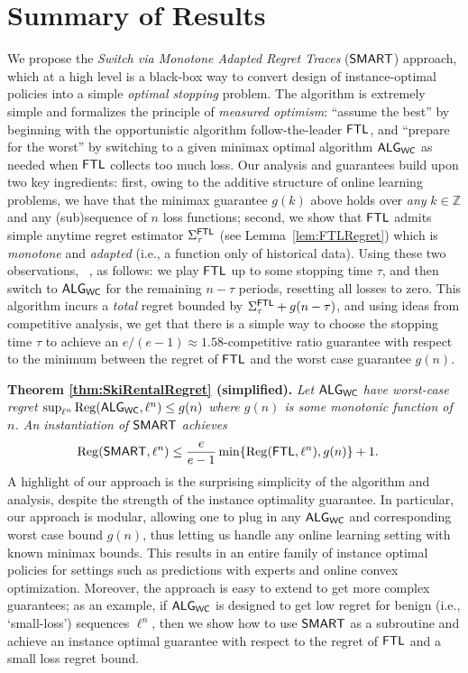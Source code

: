 \section{Summary of Results} \label{ssec:mainresults}
We propose the \emph{Switch via Monotone Adapted Regret Traces} ($\mathsf{SMART}$) approach, which at a high level is a black-box way to convert design of instance-optimal policies into a simple \emph{optimal stopping} problem. 
The algorithm is extremely simple and formalizes the principle of {\em measured optimism}: ``assume the best'' by beginning with the opportunistic algorithm follow-the-leader $\mathsf{FTL}$, and ``prepare for the worst'' by switching to a given minimax optimal algorithm $\mathsf{ALG}_{\mathsf{WC}}$ as needed when $\mathsf{FTL}$ collects too much loss.
Our analysis and guarantees build upon two key ingredients: first, owing to the additive structure of online learning problems, we have that the minimax guarantee $g(k)$ above holds over \emph{any} $k\in\mathbb{Z}$ and any (sub)sequence of $n$ loss functions; second, we show that $\mathsf{FTL}$ admits simple anytime regret estimator $\Sigma^{\mathsf{FTL}}_{\tau}$ (see Lemma~\ref{lem:FTLRegret}) which is \emph{monotone} and \emph{adapted} (i.e., a function only of historical data). Using these two observations, ~\cite{karlin1994competitive,borodin2005online}, as follows:
we play $\mathsf{FTL}$ up to some stopping time $\tau$, and then switch to $\mathsf{ALG}_{\mathsf{WC}}$ for the remaining $n-\tau$ periods, resetting all losses to zero. This algorithm  incurs a \emph{total} regret bounded by $\Sigma^{\mathsf{FTL}}_{\tau} + g(n-\tau)$, and using ideas from competitive analysis, we get that there is a simple way to choose the stopping time $\tau$ to achieve an $e/(e-1) \approx 1.58$-competitive ratio guarantee with respect to the minimum between the regret of $\mathsf{FTL}$ and the worst case guarantee $g(n)$.

{\bf Theorem \ref{thm:SkiRentalRegret} (simplified).}
{\em Let $\mathsf{ALG}_{\mathsf{WC}}$ have worst-case regret $\sup_{\ell^n} \mathrm{Reg}(\mathsf{ALG}_{\mathsf{WC}}, \ell^n) \le g(n)$
where $g(n)$ is some monotonic function of $n$. An instantiation of $\mathsf{SMART}$ achieves  
    \begin{align}
\mathrm{Reg}(\mathsf{SMART}, \ell^n)
&\le \frac{e}{e-1} \min\{\mathrm{Reg}(\mathsf{FTL},\ell^n),g(n)\} + 1. \label{eq:2ApproxReg}
    \end{align}
}
A highlight of our approach is the surprising simplicity of the algorithm and analysis, despite the strength of the instance optimality guarantee. In particular, our approach is modular, allowing one to plug in any $\mathsf{ALG}_{\mathsf{WC}}$ and corresponding worst case bound $g(n)$, thus letting us handle any online learning setting with known minimax bounds. This results in an entire family of instance optimal policies for settings such as predictions with experts and online convex optimization. Moreover, the approach is easy to extend to get more complex guarantees; as an example, if $\mathsf{ALG}_{\mathsf{WC}}$ is designed to get low regret for benign (i.e., `small-loss') sequences $\ell^n$, then we show how to use $\mathsf{SMART}$ as a subroutine and achieve an instance optimal guarantee with respect to the regret of $\mathsf{FTL}$ and a small loss regret bound. 

